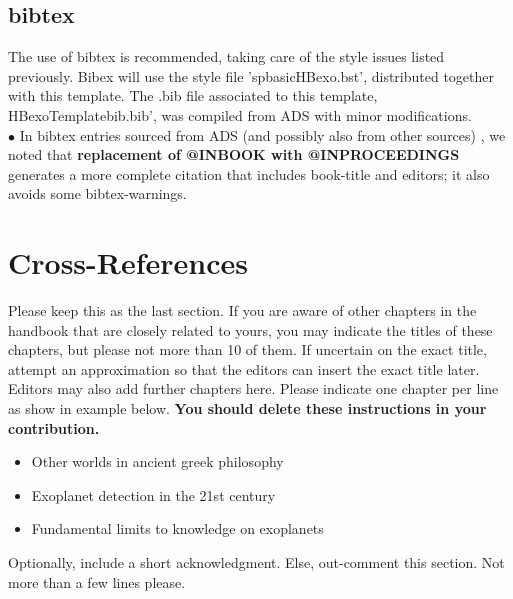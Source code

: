 \documentclass[graybox,natbib,nosecnum]{svmult}
\begin{document}
\subsection{bibtex}
The use of bibtex is recommended, taking care of the style issues listed previously. Bibex will use the style file 'spbasicHBexo.bst', distributed together with this template. The  .bib file associated to this template, HBexoTemplatebib.bib', was compiled from ADS with minor modifications.\\

$\bullet$ In bibtex entries sourced from ADS (and possibly also from other sources) , we noted that {\bf replacement of @INBOOK with @INPROCEEDINGS} generates a more complete citation that includes book-title and editors; it also avoids some bibtex-warnings.

\section{Cross-References}
Please keep this as the last section. If you are aware of other chapters in the handbook that are closely related to yours, you may indicate the titles of these chapters, but please not more than 10 of them. If uncertain on the exact title, attempt an approximation so that the editors can insert the exact title later. Editors may also add further chapters here. Please indicate one chapter per line as show in example below. {\bf You should delete these instructions in your contribution.}
\begin{itemize}
\item{Other worlds in ancient greek philosophy}
\item{Exoplanet detection in the 21st century}
\item{Fundamental limits to knowledge on exoplanets}
\end{itemize}

\begin{acknowledgement}
Optionally, include a short acknowledgment.  Else, out-comment this section. Not more than a few lines please.
\end{acknowledgement}

\end{document}
